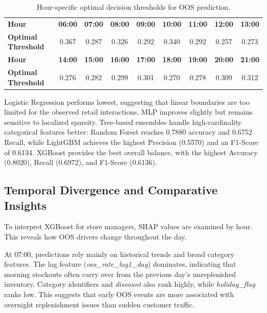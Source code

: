 \documentclass[11pt, a4paper]{article}
\begin{document}
\begin{table}[htbp]
\centering
\caption{Hour-specific optimal decision thresholds for OOS prediction.}
\label{tab:thresholds}
\vspace{3pt}
\begin{tabular}{l c c c c c c c c}
\toprule
\textbf{Hour}              & \textbf{06:00} & \textbf{07:00} & \textbf{08:00} & \textbf{09:00} & \textbf{10:00} & \textbf{11:00} & \textbf{12:00} & \textbf{13:00} \\
\textbf{Optimal Threshold} & 0.367          & 0.287          & 0.326          & 0.292          & 0.340          & 0.292          & 0.257          & 0.273          \\
\midrule
\textbf{Hour}              & \textbf{14:00} & \textbf{15:00} & \textbf{16:00} & \textbf{17:00} & \textbf{18:00} & \textbf{19:00} & \textbf{20:00} & \textbf{21:00} \\
\textbf{Optimal Threshold} & 0.276          & 0.282          & 0.299          & 0.301          & 0.270          & 0.278          & 0.309          & 0.312          \\
\bottomrule
\end{tabular}
\end{table}

Logistic Regression performs lowest, suggesting that linear boundaries are too limited for the observed retail interactions. MLP improves slightly but remains sensitive to localized sparsity. Tree-based ensembles handle high-cardinality categorical features better: Random Forest reaches 0.7880 accuracy and 0.6752 Recall, while LightGBM achieves the highest Precision (0.5570) and an F1-Score of 0.6134. XGBoost provides the best overall balance, with the highest Accuracy (0.8020), Recall (0.6972), and F1-Score (0.6136).


\subsection{Temporal Divergence and Comparative Insights}

To interpret XGBoost for store managers, SHAP values are examined by hour. This reveals how OOS drivers change throughout the day.

At 07:00, predictions rely mainly on historical trends and broad category features. The lag feature (\textit{oos\_rate\_lag1\_day}) dominates, indicating that morning stockouts often carry over from the previous day's unreplenished inventory. Category identifiers and \textit{discount} also rank highly, while \textit{holiday\_flag} ranks low. This suggests that early OOS events are more associated with overnight replenishment issues than sudden customer traffic.
\end{document}
